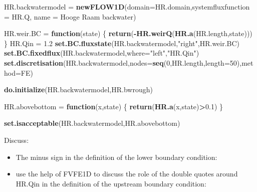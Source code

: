 \documentclass[
]{article}
\newenvironment{Shaded}{\begin{snugshade}}{\end{snugshade}}
\newcommand{\AttributeTok}[1]{\textcolor[rgb]{0.13,0.29,0.53}{#1}}
\newcommand{\ControlFlowTok}[1]{\textcolor[rgb]{0.13,0.29,0.53}{\textbf{#1}}}
\newcommand{\DecValTok}[1]{\textcolor[rgb]{0.00,0.00,0.81}{#1}}
\newcommand{\FloatTok}[1]{\textcolor[rgb]{0.00,0.00,0.81}{#1}}
\newcommand{\FunctionTok}[1]{\textcolor[rgb]{0.13,0.29,0.53}{\textbf{#1}}}
\newcommand{\NormalTok}[1]{#1}
\newcommand{\OtherTok}[1]{\textcolor[rgb]{0.56,0.35,0.01}{#1}}
\newcommand{\SpecialCharTok}[1]{\textcolor[rgb]{0.81,0.36,0.00}{\textbf{#1}}}
\newcommand{\StringTok}[1]{\textcolor[rgb]{0.31,0.60,0.02}{#1}}
\providecommand{\tightlist}{%
  \setlength{\itemsep}{0pt}\setlength{\parskip}{0pt}}
\begin{document}
\begin{Shaded}
\begin{Highlighting}[]
\NormalTok{HR.backwatermodel }\OtherTok{=} \FunctionTok{newFLOW1D}\NormalTok{(}\AttributeTok{domain=}\NormalTok{HR.domain,}\AttributeTok{systemfluxfunction =}\NormalTok{ HR.Q,}
                              \AttributeTok{name =} \StringTok{\textquotesingle{}Hooge Raam backwater\textquotesingle{}}\NormalTok{)}

\NormalTok{HR.weir.BC }\OtherTok{=} \ControlFlowTok{function}\NormalTok{(state)}
\NormalTok{\{}
  \FunctionTok{return}\NormalTok{(}\SpecialCharTok{{-}}\FunctionTok{HR.weirQ}\NormalTok{(}\FunctionTok{HR.a}\NormalTok{(HR.length,state)))}
\NormalTok{\}}
\NormalTok{HR.Qin }\OtherTok{=} \FloatTok{1.2}
\FunctionTok{set.BC.fluxstate}\NormalTok{(HR.backwatermodel,}\StringTok{"right"}\NormalTok{,HR.weir.BC)}
\FunctionTok{set.BC.fixedflux}\NormalTok{(HR.backwatermodel,}\AttributeTok{where=}\StringTok{"left"}\NormalTok{,}\StringTok{"HR.Qin"}\NormalTok{)}
\FunctionTok{set.discretisation}\NormalTok{(HR.backwatermodel,}\AttributeTok{nodes=}\FunctionTok{seq}\NormalTok{(}\DecValTok{0}\NormalTok{,HR.length,}\AttributeTok{length=}\DecValTok{50}\NormalTok{),}\AttributeTok{method=}\StringTok{\textquotesingle{}FE\textquotesingle{}}\NormalTok{)}

\FunctionTok{do.initialize}\NormalTok{(HR.backwatermodel,HR.bwrough)}

\NormalTok{HR.abovebottom }\OtherTok{=} \ControlFlowTok{function}\NormalTok{(x,state)}
\NormalTok{\{}
  \FunctionTok{return}\NormalTok{(}\FunctionTok{HR.a}\NormalTok{(x,state)}\SpecialCharTok{\textgreater{}}\FloatTok{0.1}\NormalTok{)}
\NormalTok{\}}

\FunctionTok{set.isacceptable}\NormalTok{(HR.backwatermodel,HR.abovebottom)}
\end{Highlighting}
\end{Shaded}

Discuss:

\begin{itemize}
\tightlist
\item
  The minus sign in the definition of the lower boundary condition:
\end{itemize}

\begin{itemize}
\tightlist
\item
  use the help of FVFE1D to discuss the role of the double quotes around
  HR.Qin in the definition of the upstream boundary condition:
\end{itemize}
\end{document}
